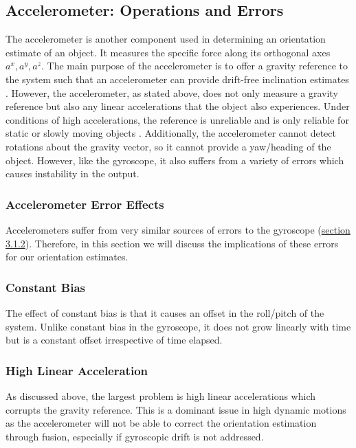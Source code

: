 \subsection{Accelerometer: Operations and Errors}
The accelerometer is another component used in determining an orientation estimate of an object.
It measures the specific force along its orthogonal axes $a^x,a^y,a^z$. The main 
purpose of the accelerometer is to offer a gravity reference to the system such that
an accelerometer can provide drift-free inclination estimates \cite{sabatini_2011_estimating}.
However, the accelerometer, as stated above, does not only measure a gravity reference but also any 
linear accelerations that the object also experiences. Under conditions of high 
accelerations, the reference is unreliable and is only reliable for static or slowly moving 
objects \cite{detection}. Additionally, the accelerometer cannot detect rotations about the gravity
vector, so it cannot provide a yaw/heading of the object.
However, like the gyroscope, it also suffers from a variety of errors which causes instability in the
output.

\subsubsection{Accelerometer Error Effects}
\label{sec:accelerrors}
Accelerometers suffer from very similar sources of errors to the gyroscope (\hyperref[sec:gyroerrors]{section 3.1.2}). Therefore, in this
section we will discuss the implications of these errors for our orientation estimates.

\subsubsection*{Constant Bias}
The effect of constant bias is that it causes an offset in the roll/pitch of the system.
Unlike constant bias in the gyroscope, it does not grow linearly with time but is a constant
offset irrespective of time elapsed.

\subsubsection*{High Linear Acceleration}
As discussed above, the largest problem is high linear accelerations which corrupts the gravity
reference. This is a dominant issue in high dynamic motions as the accelerometer will not be able
to correct the orientation estimation through fusion, especially if gyroscopic drift is not addressed. 

